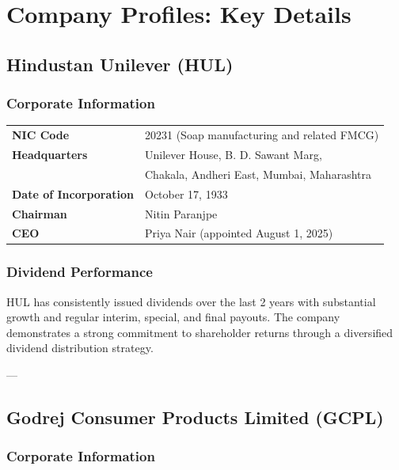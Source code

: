 \documentclass[12pt, a4paper]{report}
\begin{document}
\newpage


\chapter{Company Profiles: Key Details}

\section{Hindustan Unilever (HUL)}

\subsection{Corporate Information}

\begin{tabular}{ll}
    \textbf{NIC Code} & 20231 (Soap manufacturing and related FMCG) \\
    \textbf{Headquarters} & Unilever House, B. D. Sawant Marg, \\
                          & Chakala, Andheri East, Mumbai, Maharashtra \\
    \textbf{Date of Incorporation} & October 17, 1933 \\
    \textbf{Chairman} & Nitin Paranjpe \\
    \textbf{CEO} & Priya Nair (appointed August 1, 2025) \\
\end{tabular}

\subsection{Dividend Performance}

HUL has consistently issued dividends over the last 2 years with substantial growth and regular interim, special, and final payouts. The company demonstrates a strong commitment to shareholder returns through a diversified dividend distribution strategy.

---

\section{Godrej Consumer Products Limited (GCPL)}

\subsection{Corporate Information}
\end{document}

